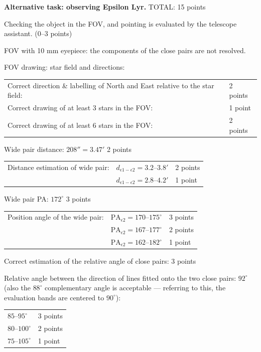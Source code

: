 
\medskip
\textbf{Alternative task: observing Epsilon Lyr.} \hfill TOTAL: 15 points

Checking the object in the FOV, and pointing is evaluated by the telescope
assistant. \hfill(0--3 points)

FOV with 10 mm eyepiece: the components of the close pairs are not resolved.


FOV drawing: star field and directions:
\begin{center}
\begin{tabular}{ll}
Correct direction \& labelling of North and East relative to the star field: & 2 points \\
Correct drawing of at least 3 stars in the FOV: & 1 point \\
Correct drawing of at least 6 stars in the FOV: & 2 points \\
\end{tabular}
\end{center}

Wide pair distance: $208'' = 3.47'$ \hfill 2 points

\begin{center}
\begin{tabular}{lll}
Distance estimation of wide pair: & $d_{\epsilon 1 - \epsilon 2} = 3.2$--$3.8'$ & 2 points \\
 & $d_{\epsilon 1 - \epsilon 2} = 2.8$--$4.2'$ & 1 point \\
\end{tabular}
\end{center}

Wide pair PA: $172^\circ$ \hfill 3 points

\begin{center}
\begin{tabular}{lll}
Position angle of the wide pair: & $\mathrm{PA}_{\epsilon 2} = 170$--$175^\circ$ & 3 points \\
 & $\mathrm{PA}_{\epsilon 2} = 167$--$177^\circ$ & 2 points \\
 & $\mathrm{PA}_{\epsilon 2} = 162$--$182^\circ$ & 1 point \\
\end{tabular}
\end{center}

Correct estimation of the relative angle of close pairs: \hfill 3 points

Relative angle between the direction of lines fitted onto the two close
pairs: $92^\circ$ (also the $88^\circ$ complementary angle is acceptable ---
referring to this, the evaluation bands are centered to $90^\circ$):
\begin{center}
\begin{tabular}{ll}
$85$--$95^\circ$ & 3 points \\
$80$--$100^\circ$ & 2 points \\
$75$--$105^\circ$ & 1 point \\
\end{tabular}
\end{center}

